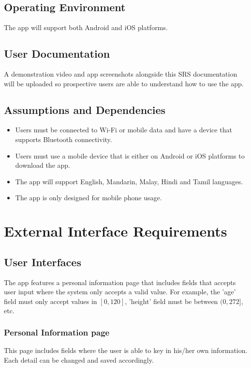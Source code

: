 \documentclass[a4paper]{scrreprt}
\begin{document}
\section{Operating Environment}
The app will support both Android and iOS platforms. 

\section{User Documentation}
A demonstration video and app screenshots alongside this SRS documentation will be uploaded so prospective users are able to understand how to use the app.

\section{Assumptions and Dependencies}
\begin{itemize}
    \item Users must be connected to Wi-Fi or mobile data and have a device that supports Bluetooth connectivity.
    \item Users must use a mobile device that is either on Android or iOS platforms to download the app.
    \item The app will support English, Mandarin, Malay, Hindi and Tamil languages.
    \item The app is only designed for mobile phone usage.
\end{itemize}

\chapter{External Interface Requirements}
\section{User Interfaces}
The app features a personal information page that includes fields that accepts user input where the system only accepts a valid value. For example, the 'age' field must only accept values in $[0, 120]$, 'height' field must be between $(0, 272]$, etc.
\newline
\subsection{Personal Information page}
This page includes fields where the user is able to key in his/her own information. Each detail can be changed and saved accordingly.
\end{document}
